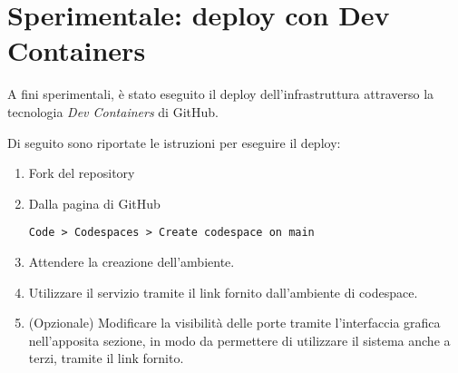 \section{Sperimentale: deploy con Dev Containers}

A fini sperimentali, è stato eseguito il deploy dell'infrastruttura attraverso la tecnologia \emph{Dev Containers} di GitHub.

Di seguito sono riportate le istruzioni per eseguire il deploy:

\begin{enumerate}
    \item Fork del repository

    \item Dalla pagina di GitHub
\begin{verbatim}
Code > Codespaces > Create codespace on main
\end{verbatim}

    \item Attendere la creazione dell'ambiente.

    \item Utilizzare il servizio tramite il link fornito dall'ambiente di codespace.

    \item (Opzionale) Modificare la visibilità delle porte tramite l'interfaccia grafica nell'apposita sezione, in modo da permettere di utilizzare il sistema anche a terzi, tramite il link fornito.
\end{enumerate}